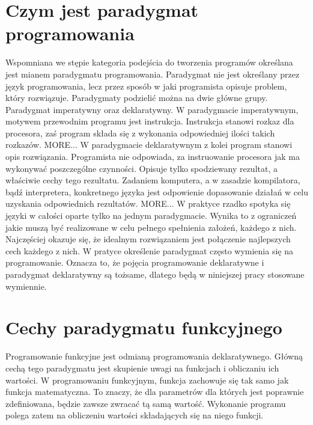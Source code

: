 \documentclass[a4paper,10pt]{report}
\begin{document}
\section{Czym jest paradygmat programowania}
Wspomniana we stępie kategoria podejścia do tworzenia programów określana jest mianem paradygmatu programowania. Paradygmat nie jest określany przez język programowania, lecz przez sposób w jaki programista opisuje problem, który rozwiązuje. Paradygmaty podzielić można na dwie główne grupy. Paradygmat imperatywny oraz deklaratywny. W paradygmacie imperatywnym, motywem przewodnim programu jest instrukcja. Instrukcja stanowi rozkaz dla procesora, zaś program składa się z wykonania odpowiedniej ilości takich rozkazów. MORE... W paradygmacie deklaratywnym z kolei program stanowi opis rozwiązania. Programista nie odpowiada, za instruowanie procesora jak ma wykonywać poszczególne czynności. Opisuje tylko spodziewany rezultat, a właściwie cechy tego rezultatu. Zadaniem komputera, a w zasadzie kompilatora, bądź interpretera, konkretnego języka jest odpowienie dopasowanie działań w celu uzyskania odpowiednich rezultatów. MORE... W praktyce rzadko spotyka się języki w całości oparte tylko na jednym paradygmacie. Wynika to z ograniczeń jakie muszą być realizowane w celu pełnego spełnienia założeń, każdego z nich. Najczęściej okazuje się, że idealnym rozwiązaniem jest połączenie najlepszych cech każdego z nich. W pratyce określenie paradygmat często wymienia się na programowanie. Oznacza to, że pojęcia programowanie deklaratywne i paradygmat deklaratywny są tożsame, dlatego będą w niniejszej pracy stosowane wymiennie.
\section{Cechy paradygmatu funkcyjnego}
Programowanie funkcyjne jest odmianą programowania deklaratywnego. Główną cechą tego paradygmatu jest skupienie uwagi na funkcjach i obliczaniu ich wartości. W programowaniu funkcyjnym, funkcja zachowuje się tak samo jak funkcja matematyczna. To znaczy, że dla parametrów dla których jest poprawnie zdefiniowana, będzie zawsze zwracać tą samą wartość. Wykonanie programu polega zatem na obliczeniu wartości składających się na niego funkcji.
\end{document}
